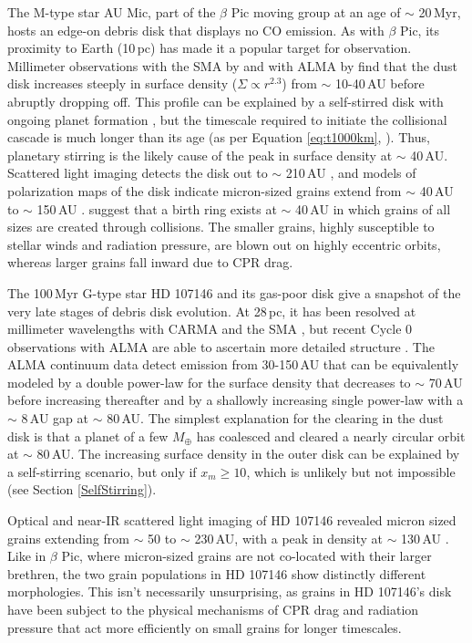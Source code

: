 The M-type star AU Mic, part of the $\beta$ Pic moving group at an age of $\sim$ 20\,Myr, hosts an edge-on debris disk that displays no CO emission. As with $\beta$ Pic, its proximity to Earth (10\,pc) has made it a popular target for observation. Millimeter observations with the SMA by \cite{Wiln12} and with ALMA by \cite{Macg13} find that the dust disk increases steeply in surface density ($\Sigma \propto r^{2.3}$) from $\sim$ 10-40\,AU before abruptly dropping off. This profile can be explained by a self-stirred disk with ongoing planet formation \citep{Kenn10}, but the timescale required to initiate the collisional cascade is much longer than its age (as per Equation \ref{eq:t1000km}, \citealt{Keny08}). Thus, planetary stirring is the likely cause of the peak in surface density at $\sim$ 40\,AU. Scattered light imaging detects the disk out to $\sim$ 210\,AU \citep{Kala04,Kris05}, and models of polarization maps of the disk indicate micron-sized grains extend from $\sim$ 40\,AU to $\sim$ 150\,AU \citep{Grah07}. \cite{Stru06} suggest that a birth ring exists at $\sim$ 40\,AU in which grains of all sizes are created through collisions. The smaller grains, highly susceptible to stellar winds and radiation pressure, are blown out on highly eccentric orbits, whereas larger grains fall inward due to CPR drag. 

The 100\,Myr G-type star HD 107146 and its gas-poor disk give a snapshot of the very late stages of debris disk evolution. At 28\,pc, it has been resolved at millimeter wavelengths with CARMA \citep{Cord09} and the SMA \citep{Hugh11}, but recent Cycle 0 observations with ALMA are able to ascertain more detailed structure \citep{Ricc15}. The ALMA continuum data detect emission from 30-150\,AU that can be equivalently modeled by a double power-law for the surface density that decreases to $\sim$ 70\,AU before increasing thereafter and by a shallowly increasing single power-law with a $\sim$ 8\,AU gap at $\sim$ 80\,AU. The simplest explanation for the clearing in the dust disk is that a planet of a few $M_{\oplus}$ has coalesced and cleared a nearly circular orbit at $\sim$ 80\,AU. The increasing surface density in the outer disk can be explained by a self-stirring scenario, but only if $x_{m} \geq 10$, which is unlikely but not impossible (see Section \ref{SelfStirring}). 

Optical and near-IR scattered light imaging of HD 107146 revealed micron sized grains extending from $\sim$ 50 to $\sim$ 230\,AU, with a peak in density at $\sim$ 130\,AU \citep{Ardi04,Erte11}. Like in $\beta$ Pic, where micron-sized grains are not co-located with their larger brethren, the two grain populations in HD 107146 show distinctly different morphologies. This isn't necessarily unsurprising, as grains in HD 107146's disk have been subject to the physical mechanisms of CPR drag and radiation pressure that act more efficiently on small grains for longer timescales. 

